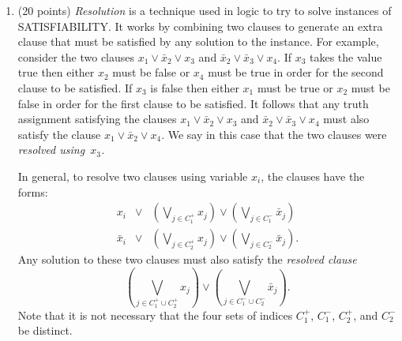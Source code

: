 \documentclass[12pt]{article}
\begin{document}
\begin{enumerate}
  \newpage
  \setcounter{page}{4}  \quad  \vspace*{\fill}   \quad
  \newpage
  \setcounter{page}{4}  \quad  \vspace*{\fill}   \quad
\newpage
\item (20 points)
  {\em Resolution} is a technique used in logic to try to solve instances
  of SATISFIABILITY. It works by combining two clauses to generate an
extra clause that must be satisfied by any solution to the instance.
For example, consider the two clauses $x_1 \vee \bar{x}_2 \vee x_3$
and $\bar{x}_2 \vee \bar{x}_3 \vee x_4$.
If $x_3$ takes the value true then either $x_2$ must be false or $x_4$ must be
true in order for the second clause to be satisfied. If $x_3$ is false
then either $x_1$ must be true or $x_2$ must be false
in order for the first clause to be satisfied. It follows that
any truth assignment satisfying the clauses $x_1 \vee \bar{x}_2 \vee x_3$
and $\bar{x}_2 \vee \bar{x}_3 \vee x_4$
must also satisfy the clause $x_1 \vee \bar{x}_2 \vee x_4$.
We say in this case that the two clauses were {\em resolved using~$x_3$.}

In general, to resolve two clauses using variable $x_i$, the clauses have
the forms:
\begin{eqnarray}
\label{eqn_preres1}
x_i & \vee & ( \bigvee_{j \in C_1^+} x_j ) \vee
 ( \bigvee_{j \in C_1^-} \bar{x}_j )
\\
\label{eqn_preres2}
\bar{x}_i
    & \vee & ( \bigvee_{j \in C_2^+} x_j ) \vee
 ( \bigvee_{j \in C_2^-} \bar{x}_j ).
\end{eqnarray}
Any solution to these two clauses must also satisfy the {\em resolved clause}
\begin{equation}
\label{eqn_resolved}
( \bigvee_{j \in C_1^+ \cup C_2^+} x_j ) \vee
( \bigvee_{j \in C_1^- \cup C_2^-} \bar{x}_j ).
\end{equation}
Note that it is not necessary that the four sets of indices
$C_1^+$, $C_1^-$, $C_2^+$, and $C_2^-$ be distinct.


\end{enumerate}
\end{document}
